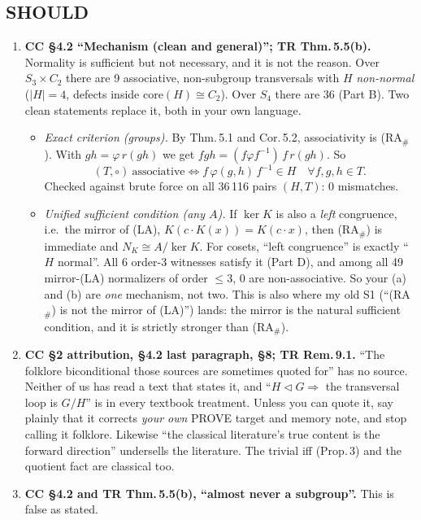 \documentclass[11pt]{article}
\begin{document}
\subsection*{SHOULD}
\begin{enumerate}[label=\textbf{S\arabic*.},leftmargin=*]
\item \textbf{CC \S4.2 ``Mechanism (clean and general)''; TR Thm.\,5.5(b).} Normality is sufficient but
  not necessary, and it is not the reason. Over $S_3\times C_2$ there are 9 associative, non-subgroup
  transversals with $H$ \emph{non-normal} ($|H|=4$, defects inside $\mathrm{core}(H)\cong C_2$). Over $S_4$
  there are 36 (Part B). Two clean statements replace it, both in your own language.
  \begin{itemize}[leftmargin=*]
  \item \emph{Exact criterion (groups).} By Thm.\,5.1 and Cor.\,5.2, associativity is (RA$_\#$). With
    $gh=\varphi\,r(gh)$ we get $fgh=(f\varphi f^{-1})\,f\,r(gh)$. So
    \[(T,\circ)\ \text{associative}\iff f\,\varphi(g,h)\,f^{-1}\in H\quad\forall f,g,h\in T.\]
    Checked against brute force on all 36\,116 pairs $(H,T)$: 0 mismatches.
  \item \emph{Unified sufficient condition (any $A$).} If $\ker K$ is also a \emph{left} congruence,
    i.e.\ the mirror of (LA), $K(c\cdot K(x))=K(c\cdot x)$, then (RA$_\#$) is immediate and
    $N_K\cong A/{\ker K}$. For cosets, ``left congruence'' is exactly ``$H$ normal''. All 6 order-3
    witnesses satisfy it (Part D), and among all 49 mirror-(LA) normalizers of order ${\le}3$, 0 are
    non-associative. So your (a) and (b) are \emph{one} mechanism, not two. This is also where my
    old S1 (``(RA$_\#$) is not the mirror of (LA)'') lands: the mirror is the natural sufficient condition, and it
    is strictly stronger than (RA$_\#$).
  \end{itemize}
\item \textbf{CC \S2 attribution, \S4.2 last paragraph, \S8; TR Rem.\,9.1.} ``The folklore
  biconditional those sources are sometimes quoted for'' has no source. Neither of us has read a
  text that states it, and ``$H\lhd G\Rightarrow$ the transversal loop is $G/H$'' is in every textbook
  treatment. Unless you can quote it, say plainly that it corrects \emph{your own} PROVE target and
  memory note, and stop calling it folklore. Likewise ``the classical literature's true content is the
  forward direction'' undersells the literature. The trivial iff (Prop.\,3) and the quotient fact are
  classical too.
\item \textbf{CC \S4.2 and TR Thm.\,5.5(b), ``almost never a subgroup''.} This is false as stated.

\end{enumerate}
\end{document}
